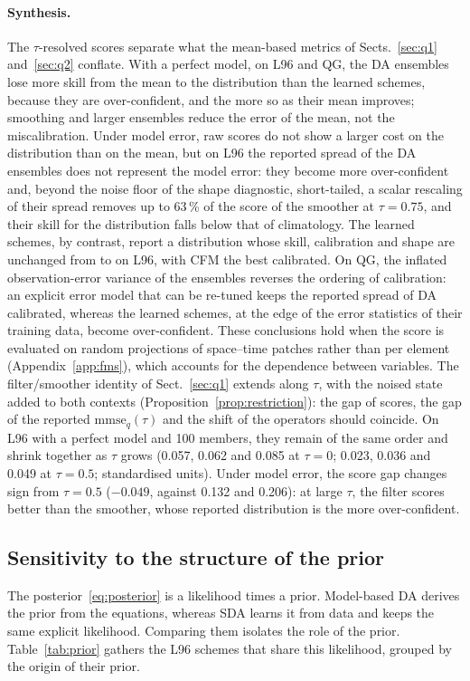 \paragraph{Synthesis.}
The $\tau$-resolved scores separate what the mean-based metrics of Sects.~\ref{sec:q1}
and~\ref{sec:q2} conflate. With a perfect model, on L96 and QG, the DA ensembles lose more skill from
the mean to the distribution than the learned schemes, because they are over-confident,
and the more so as their mean improves; smoothing and larger ensembles reduce the error
of the mean, not the miscalibration. Under model error, raw scores do not show a larger cost on the
distribution than on the mean, but on L96 the reported spread of the DA ensembles does not
represent the model error: they become more over-confident and, beyond the noise floor of the
shape diagnostic, short-tailed, a scalar rescaling of their spread removes up to 63\,\% of the
score of the smoother at $\tau = 0.75$, and their skill for the distribution falls below that
of climatology. The learned schemes, by
contrast, report a distribution whose skill, calibration and shape are unchanged from \Sz{} to
\So{} on L96, with CFM the best calibrated. On
QG, the inflated observation-error variance of the \So{} ensembles reverses the ordering
of calibration: an explicit error model that can be re-tuned keeps the reported spread of
DA calibrated, whereas the learned schemes, at the edge of the error statistics of their
training data, become over-confident.
These conclusions hold when the score is evaluated on random projections of space--time
patches rather than per element (Appendix~\ref{app:fms}), which accounts for the
dependence between variables. The filter/smoother identity of Sect.~\ref{sec:q1} extends along
$\tau$, with the noised state added to both contexts (Proposition~\ref{prop:restriction}): the gap of
scores, the gap of the reported $\mathrm{mmse}_q(\tau)$ and the shift of the operators should coincide. On L96
with a perfect model and 100 members, they remain of the same order and shrink together as $\tau$ grows
(0.057, 0.062 and 0.085 at $\tau = 0$; 0.023, 0.036 and 0.049 at $\tau = 0.5$; standardised units).
Under model error, the score gap changes sign from $\tau = 0.5$ ($-0.049$, against 0.132 and 0.206):
at large $\tau$, the filter scores better than the smoother, whose reported distribution is the more
over-confident.

\subsection{Sensitivity to the structure of the prior}\label{sec:q3}\label{sec:composition}
The posterior~\eqref{eq:posterior} is a likelihood times a prior. Model-based DA
derives the prior from the equations, whereas SDA learns it from data and keeps the same
explicit likelihood. Comparing them isolates the role of the prior.
Table~\ref{tab:prior} gathers the L96 schemes that share this likelihood, grouped by the
origin of their prior.


